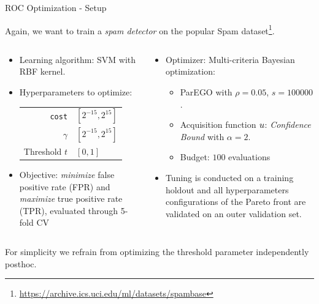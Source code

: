 \begin{frame}{ROC Optimization - Setup}

  Again, we want to train a \textit{spam detector} on the popular Spam dataset\footnote{\url{https://archive.ics.uci.edu/ml/datasets/spambase}}.

\begin{columns}
\begin{column}{0.5\textwidth}
\begin{itemize}
        \item Learning algorithm: SVM with RBF kernel.
        \item Hyperparameters to optimize: \\
        \begin{tabular}{rl}
        \texttt{cost} & $[2^{-15}, 2^{15}]$ \\
        $\gamma$ & $[2^{-15}, 2^{15}]$ \\
        Threshold $t$ & $[0,1]$ \\
        \end{tabular}
        \item Objective: \emph{minimize} false positive rate (FPR) and \emph{maximize} true positive rate (TPR), evaluated through 5-fold CV
\end{itemize}
\end{column}%
\begin{column}{0.5\textwidth}
\begin{itemize}
        \item Optimizer: Multi-criteria Bayesian optimization:
            \begin{itemize}
              \item ParEGO with $\rho = 0.05$, $s = 100000$.
              \item Acquisition function $u$: \emph{Confidence Bound} with $\alpha = 2$.
              \item Budget: $100$ evaluations
            \end{itemize}
        \item Tuning is conducted on a training holdout and all hyperparameters configurations of the Pareto front are validated on an outer validation set.
\end{itemize}
\end{column}
\end{columns}
\vspace{0.5cm}
{\footnotesize For simplicity we refrain from optimizing the threshold parameter independently posthoc.}
\end{frame}

